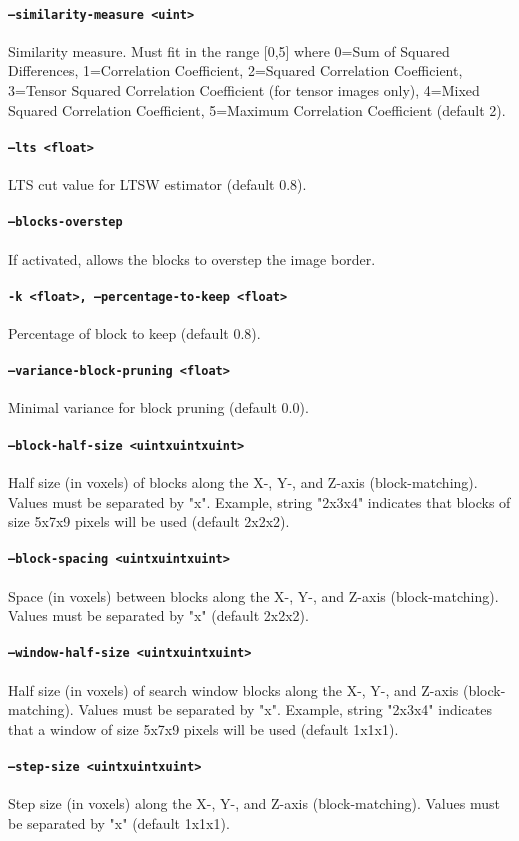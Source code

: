 \paragraph{\texttt{--similarity-measure <uint>}}
Similarity measure. Must fit in the range [0,5] where 0=Sum of Squared
Differences, 1=Correlation Coefficient, 2=Squared Correlation
Coefficient, 3=Tensor Squared Correlation Coefficient (for tensor
images only), 4=Mixed Squared Correlation Coefficient, 5=Maximum
Correlation Coefficient (default 2).

\paragraph{\texttt{--lts <float>}}
LTS cut value for LTSW estimator (default 0.8).

\paragraph{\texttt{--blocks-overstep}}
If activated, allows the blocks to overstep the image border.

\paragraph{\texttt{-k <float>,  --percentage-to-keep <float>}}
Percentage of block to keep (default 0.8).

\paragraph{\texttt{--variance-block-pruning <float>}}
Minimal variance for block pruning (default 0.0).

\paragraph{\texttt{--block-half-size <uintxuintxuint>}}
Half size (in voxels) of blocks along the X-, Y-, and Z-axis
(block-matching). Values must be separated by "x". Example, string
"2x3x4" indicates that blocks of size 5x7x9 pixels will be used
(default 2x2x2).

\paragraph{\texttt{--block-spacing <uintxuintxuint>}}
Space (in voxels) between blocks along the X-, Y-, and Z-axis
(block-matching). Values must be separated by "x" (default 2x2x2).

\paragraph{\texttt{--window-half-size <uintxuintxuint>}}
Half size (in voxels) of search window blocks along the X-, Y-, and
Z-axis (block-matching). Values must be separated by "x". Example,
string "2x3x4" indicates that a window of size 5x7x9 pixels will be
used (default 1x1x1).

\paragraph{\texttt{--step-size <uintxuintxuint>}}
Step size (in voxels) along the X-, Y-, and Z-axis (block-matching).
Values must be separated by "x" (default 1x1x1).